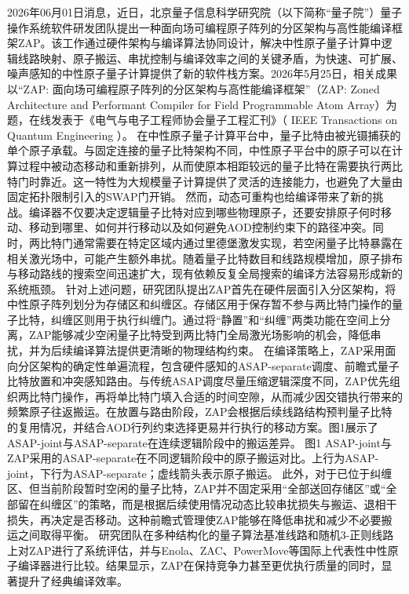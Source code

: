 \documentclass[12pt,a4paper]{ctexart}
\begin{document}
2026年06月01日消息，近日，北京量子信息科学研究院（以下简称“量子院”）量子操作系统软件研发团队提出一种面向场可编程原子阵列的分区架构与高性能编译框架ZAP。该工作通过硬件架构与编译算法协同设计，解决中性原子量子计算中逻辑线路映射、原子搬运、串扰控制与编译效率之间的关键矛盾，为快速、可扩展、噪声感知的中性原子量子计算提供了新的软件栈方案。2026年5月25日，相关成果以“ZAP: 面向场可编程原子阵列的分区架构与高性能编译框架”（ZAP: Zoned Architecture and Performant Compiler for Field Programmable Atom Array）为题，在线发表于《电气与电子工程师协会量子工程汇刊》（
IEEE Transactions on Quantum Engineering
）。
在中性原子量子计算平台中，量子比特由被光镊捕获的单个原子承载。与固定连接的量子比特架构不同，中性原子平台中的原子可以在计算过程中被动态移动和重新排列，从而使原本相距较远的量子比特在需要执行两比特门时靠近。这一特性为大规模量子计算提供了灵活的连接能力，也避免了大量由固定拓扑限制引入的SWAP门开销。
然而，动态可重构也给编译带来了新的挑战。编译器不仅要决定逻辑量子比特对应到哪些物理原子，还要安排原子何时移动、移动到哪里、如何并行移动以及如何避免AOD控制约束下的路径冲突。同时，两比特门通常需要在特定区域内通过里德堡激发实现，若空闲量子比特暴露在相关激光场中，可能产生额外串扰。随着量子比特数目和线路规模增加，原子排布与移动路线的搜索空间迅速扩大，现有依赖反复全局搜索的编译方法容易形成新的系统瓶颈。
针对上述问题，研究团队提出ZAP首先在硬件层面引入分区架构，将中性原子阵列划分为存储区和纠缠区。存储区用于保存暂不参与两比特门操作的量子比特，纠缠区则用于执行纠缠门。通过将“静置”和“纠缠”两类功能在空间上分离，ZAP能够减少空闲量子比特受到两比特门全局激光场影响的机会，降低串扰，并为后续编译算法提供更清晰的物理结构约束。
在编译策略上，ZAP采用面向分区架构的确定性单遍流程，包含硬件感知的ASAP-separate调度、前瞻式量子比特放置和冲突感知路由。与传统ASAP调度尽量压缩逻辑深度不同，ZAP优先组织两比特门操作，再将单比特门填入合适的时间空隙，从而减少因交错执行带来的频繁原子往返搬运。在放置与路由阶段，ZAP会根据后续线路结构预判量子比特的复用情况，并结合AOD行列约束选择更易并行执行的移动方案。图1展示了ASAP-joint与ASAP-separate在连续逻辑阶段中的搬运差异。
图1 ASAP-joint与ZAP采用的ASAP-separate在不同逻辑阶段中的原子搬运对比。上行为ASAP-joint，下行为ASAP-separate；虚线箭头表示原子搬运。
此外，对于已位于纠缠区、但当前阶段暂时空闲的量子比特，ZAP并不固定采用“全部送回存储区”或“全部留在纠缠区”的策略，而是根据后续使用情况动态比较串扰损失与搬运、退相干损失，再决定是否移动。这种前瞻式管理使ZAP能够在降低串扰和减少不必要搬运之间取得平衡。
研究团队在多种结构化的量子算法基准线路和随机3-正则线路上对ZAP进行了系统评估，并与Enola、ZAC、PowerMove等国际上代表性中性原子编译器进行比较。结果显示，ZAP在保持竞争力甚至更优执行质量的同时，显著提升了经典编译效率。
\end{document}
